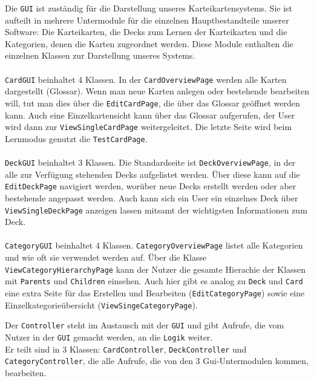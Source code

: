 \documentclass[fontsize=12pt,paper=A4,twoside]{scrartcl}
\begin{document}
    Die \texttt{GUI} ist zuständig für die Darstellung unseres Karteikartensystems.
    Sie ist aufteilt in mehrere Untermodule für die einzelnen Hauptbestandteile
    unserer Software: Die Karteikarten, die Decks zum Lernen der Karteikarten und die Kategorien,
    denen die Karten zugeordnet werden. Diese Module enthalten die einzelnen Klassen zur Darstellung
    unseres Systems.\\\\
     \texttt{CardGUI} beinhaltet 4 Klassen. In der \texttt{CardOverviewPage} werden
    alle Karten dargestellt (Glossar). Wenn man neue Karten anlegen oder bestehende bearbeiten will, tut
    man dies über die \texttt{EditCardPage}, die über das Glossar geöffnet werden kann. Auch eine Einzelkartensicht
    kann über das Glossar aufgerufen, der User wird dann zur \texttt{ViewSingleCardPage} weitergeleitet.
    Die letzte Seite wird beim Lernmodus genutzt die \texttt{TestCardPage}.\\\\
     \texttt{DeckGUI} beinhaltet 3 Klassen. Die Standardseite ist \texttt{DeckOverviewPage},
    in der alle zur Verfügung stehenden Decks aufgelistet werden. Über diese kann auf die \texttt{EditDeckPage}
    navigiert werden, worüber neue Decks erstellt werden oder aber bestehende angepasst werden. Auch kann sich ein
    User ein einzelnes Deck über \texttt{ViewSingleDeckPage} anzeigen lassen mitsamt der wichtigsten Informationen
    zum Deck.\\\\
     \texttt{CategoryGUI} beinhaltet 4 Klassen. \texttt{CategoryOverviewPage} listet alle Kategorien
    und wie oft sie verwendet werden auf. Über die Klasse \texttt{ViewCategoryHierarchyPage} kann
    der Nutzer die gesamte Hierachie der Klassen mit \texttt{Parents} und \texttt{Children} einsehen.
    Auch hier gibt es analog zu \texttt{Deck} und \texttt{Card} eine extra Seite für das Erstellen und Bearbeiten
    (\texttt{EditCategoryPage}) sowie eine Einzelkategorieübersicht (\texttt{ViewSingeCategoryPage}).

    Der \texttt{Controller} steht im Austausch mit der \texttt{GUI} und gibt Aufrufe, die vom Nutzer
    in der \texttt{GUI} gemacht werden, an die \texttt{Logik} weiter.\\
    Er teilt sind in 3 Klassen: \texttt{CardController}, \texttt{DeckController} und \texttt{CategoryController}, die alle Aufrufe, die von den 3 Gui-Untermodulen kommen, bearbeiten.
\end{document}
